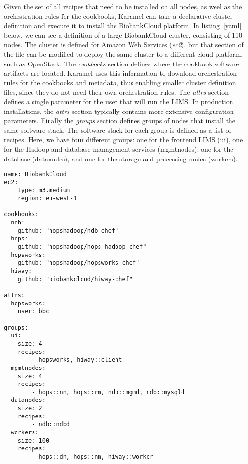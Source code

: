Given the set of all recipes that need to be installed on all nodes, as weel as the orchestration rules for the cookbooks, Karamel can take a declarative cluster definition and execute it to install the BiobankCloud platform. In listing~\ref{yaml} below, we can see a definition of a large BiobankCloud cluster, consisting of 110 nodes. The cluster is defined for Amazon Web Services (\textit{ec2}), but that section of the file can be modified to deploy the same cluster to a different cloud platform, such as OpenStack. The \textit{cookbooks} section defines where the cookbook software artifacts are located. Karamel uses this information to download orchestration rules for the cookbooks and metadata, thus enabling smaller cluster definition files, since they do not need their own orchestration rules. The \textit{attrs} section defines a single parameter for the user that will run the LIMS. In production installations, the \textit{attrs} section typically contains more extensive configuration parameters. Finally the \textit{groups} section defines groups of nodes that install the same software stack. The software stack for each group is defined as a list of recipes. Here, we have four different groups: one for the frontend LIMS (ui), one for the Hadoop and database management services (mgmtnodes), one for the database (datanodes), and one for the storage and processing nodes (workers).

\begin{lstlisting}[frame=shadowbox,label=karamel-cluster,caption=Karamel Cluster Definition for BiobankCloud,float=t]
name: BiobankCloud
ec2:
    type: m3.medium
    region: eu-west-1

cookbooks:
  ndb: 
    github: "hopshadoop/ndb-chef"
  hops: 
    github: "hopshadoop/hops-hadoop-chef"
  hopsworks: 
    github: "hopshadoop/hopsworks-chef"
  hiway: 
    github: "biobankcloud/hiway-chef"
    
attrs:
  hopsworks:
    user: bbc
    
groups: 
  ui:
    size: 4
    recipes: 
        - hopsworks, hiway::client
  mgmtnodes:
    size: 4
    recipes: 
        - hops::nn, hops::rm, ndb::mgmd, ndb::mysqld
  datanodes:
    size: 2
    recipes: 
        - ndb::ndbd
  workers:
    size: 100
    recipes: 
        - hops::dn, hops::nm, hiway::worker
\end{lstlisting}\label{yaml}
